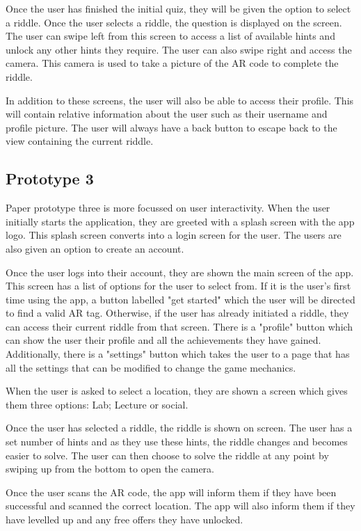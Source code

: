 \documentclass[10pt,twocolumn]{article} %
\begin{document}
Once the user has finished the initial quiz, they will be given the option to select a riddle. Once the user selects a riddle, the question is displayed on the screen. The user can swipe left from this screen to access a list of available hints and unlock any other hints they require. The user can also swipe right and access the camera. This camera is used to take a picture of the AR code to complete the riddle. 

In addition to these screens, the user will also be able to access their profile. This will contain relative information about the user such as their username and profile picture. The user will always have a back button to escape back to the view containing the current riddle.

\subsection*{Prototype 3}
Paper prototype three is more focussed on user interactivity. When the user initially starts the application, they are greeted with a splash screen with the app logo. This splash screen converts into a login screen for the user. The users are also given an option to create an account.

Once the user logs into their account, they are shown the main screen of the app. This screen has a list of options for the user to select from. If it is the user's first time using the app, a button labelled "get started" which the user will be directed to find a valid AR tag. Otherwise, if the user has already initiated a riddle, they can access their current riddle from that screen. There is a "profile" button which can show the user their profile and all the achievements they have gained. Additionally, there is a "settings" button which takes the user to a page that has all the settings that can be modified to change the game mechanics.

When the user is asked to select a location, they are shown a screen which gives them three options: Lab; Lecture or social.

Once the user has selected a riddle, the riddle is shown on screen. The user has a set number of hints and as they use these hints, the riddle changes and becomes easier to solve. The user can then choose to solve the riddle at any point by swiping up from the bottom to open the camera. 

Once the user scans the AR code, the app will inform them if they have been successful and scanned the correct location. The app will also inform them if they have levelled up and any free offers they have unlocked.
\end{document}
